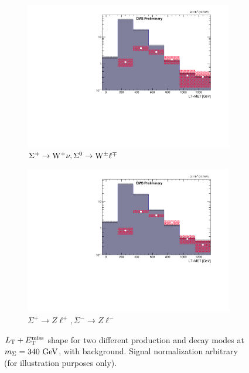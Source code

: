 \begin{figure}
\begin{center}
	\begin{subfigure}[b]{.7\textwidth}
		\includegraphics[width=\textwidth]{Strategy/LT+MET_tr+w+vltr0wl}
		\caption{$\Sigma^+ \to \mathrm{W}^+ \nu, \Sigma^0 \to \mathrm{W}^\pm \ell^\mp$}
	\end{subfigure}
	\begin{subfigure}[b]{.7\textwidth}
		\includegraphics[width=\textwidth]{Strategy/LT+MET_tr+zl+tr-zl-}
		\caption{$\Sigma^+ \to Z \ell^+, \Sigma^- \to Z \ell^-$}
	\end{subfigure}
	\caption{$L_\textrm{T} + E_{\mathrm{T}}^{\text{miss}}$ shape for two different production and decay modes at $m_\Sigma = 340\,\,\text{Ge\hspace{-.08em}V}$, with \WZ background. Signal normalization arbitrary (for illustration purposes only).
	\label{fig:Optimization2}}
\end{center}
\end{figure}

